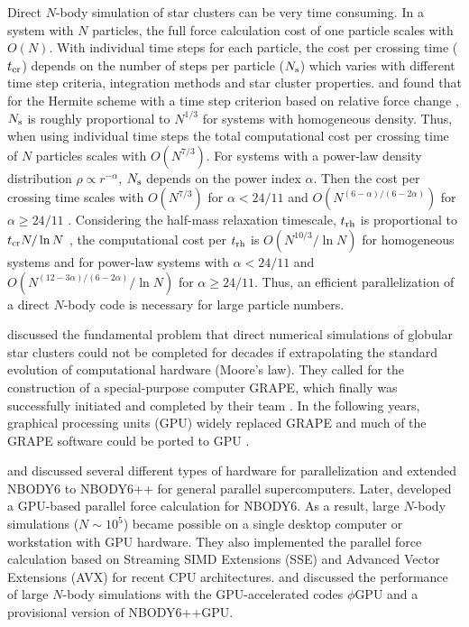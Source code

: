 \documentclass[usenatbib,aas_macros]{mn2e}
\def\nbody{NBODY6 }
\def\nbodypp{NBODY6++ }
\def\nb{$N$-body }
\begin{document}
Direct \nb simulation of star clusters can be very time consuming. 
In a system with $N$ particles, the full force calculation cost of one particle scales with $O(N)$. 
With individual time steps for each particle, the cost per crossing time ($t_{\rm cr}$) depends on the number of steps per particle ($N_{\rm s}$) which varies with different time step criteria, integration methods and star cluster properties.
\cite{Makino1988} and \cite{Makino1992} found that for the Hermite scheme with a time step criterion based on relative force change \citep{Aarseth1985}, $N_{\rm s}$ is roughly proportional to $N^{1/3}$ for systems with homogeneous density. 
Thus, when using individual time steps the total computational cost per crossing time of $N$ particles scales with $O(N^{7/3})$. 
For systems with a power-law density distribution $\rho \propto r^{-\alpha}$, $N_{\rm s}$ depends on the power index $\alpha$.
Then the cost per crossing time scales with $O(N^{7/3})$ for $\alpha < 24/11$ and $O(N^{(6-\alpha)/(6-2\alpha)})$ for $\alpha \ge 24/11$ \citep{Makino1988}.
Considering the half-mass relaxation timescale, $t_{\rm rh}$ is proportional to $t_{\rm cr} N/\ln{N}$ \citep{Spitzer1987,Sugimoto1990}, the computational cost per $t_{\rm rh}$ is $O(N^{10/3}/\ln{N})$ for homogeneous systems and for power-law systems with $\alpha < 24/11$ and $O(N^{(12-3\alpha)/(6-2\alpha)}/\ln{N})$ for $\alpha \ge 24/11$. 
Thus, an efficient parallelization of a direct \nb code is necessary for large particle numbers.

\cite{Sugimoto1990} discussed the fundamental problem that direct numerical simulations of globular star clusters could not be completed for decades if extrapolating the standard evolution of computational hardware (Moore's law).
They called for the construction of a special-purpose computer GRAPE, which finally was successfully initiated and completed by their team \citep{Makino1993,Makino1998,Makino2003}.
In the following years, graphical processing units (GPU) widely replaced GRAPE \citep[e.g.,][]{Harfst2007,Hennebelle2007,PZ2007,Belleman2008,Schive2008} and much of the GRAPE software could be ported to GPU \citep{Gaburov2009}.

\cite{Spurzem1999,Spurzem2008} and \cite{Hemsendorf2003} discussed several different types of hardware for parallelization and extended \nbody to \nbodypp  for general parallel supercomputers.  
Later, \cite{Nitadori2012} developed a GPU-based parallel force calculation for NBODY6.
As a result, large $N$-body simulations ($N\sim 10^5$) became possible on a single desktop computer or workstation with GPU hardware. 
They also implemented the parallel force calculation based on Streaming SIMD Extensions (SSE) and Advanced Vector Extensions (AVX) for recent CPU architectures.
\cite{Spurzem2011,Berczik2013a} and \cite{Berczik2013b} discussed the performance of large \nb simulations with the GPU-accelerated codes $\phi$GPU and a provisional version of NBODY6++GPU.
\end{document}
